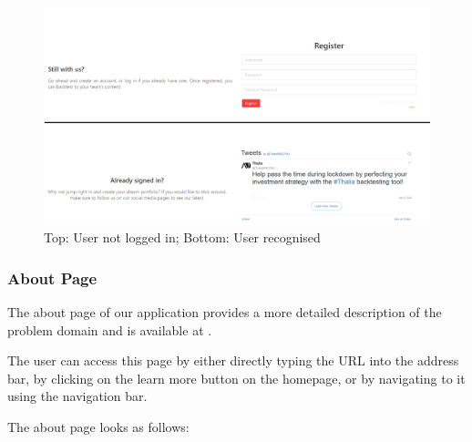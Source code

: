 \documentclass[main.tex]{subfiles}
\begin{document}
\begin{figure}[H]
   \centering
   \includegraphics[width=\textwidth]{08Appendices/081User/081Pictures/homepage_bottom.png}
   \caption{Top: User not logged in; Bottom: User recognised}
   \label{thalia_home_bottom}
\end{figure}

\subsubsection{About Page}
The about page of our application provides a more detailed description of the problem domain and is available at .

The user can access this page by either directly typing the URL into the address bar, by clicking on the learn more button on the homepage, or by navigating to it using the navigation bar.

The about page looks as follows:
\end{document}
